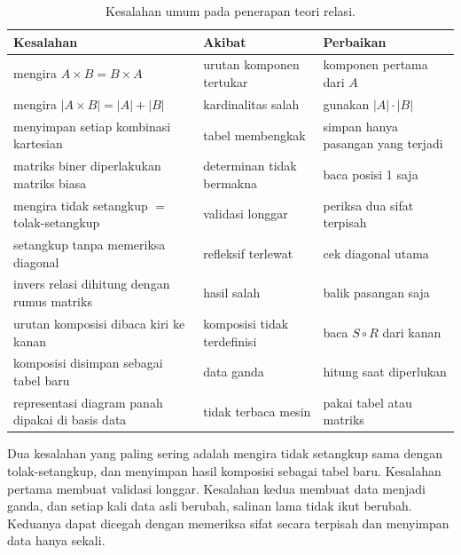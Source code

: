 \documentclass[11pt,a4paper]{article}
\begin{document}
\begin{table}[H]
	\centering
	\caption{Kesalahan umum pada penerapan teori relasi.}
	\label{tab:kesalahan}
	\footnotesize
	\begin{tabularx}{\textwidth}{l X X}
		\toprule
		Kesalahan                                        & Akibat                      & Perbaikan                          \\
		\midrule
		mengira $A \times B=B \times A$                  & urutan komponen tertukar    & komponen pertama dari $A$          \\
		mengira $|A \times B|=|A|+|B|$                   & kardinalitas salah          & gunakan $|A| \cdot |B|$            \\
		menyimpan setiap kombinasi kartesian             & tabel membengkak            & simpan hanya pasangan yang terjadi \\
		matriks biner diperlakukan matriks biasa         & determinan tidak bermakna   & baca posisi 1 saja                 \\
		mengira tidak setangkup $=$ tolak-setangkup      & validasi longgar            & periksa dua sifat terpisah         \\
		setangkup tanpa memeriksa diagonal               & refleksif terlewat          & cek diagonal utama                 \\
		invers relasi dihitung dengan rumus matriks      & hasil salah                 & balik pasangan saja                \\
		urutan komposisi dibaca kiri ke kanan            & komposisi tidak terdefinisi & baca $S \circ R$ dari kanan        \\
		komposisi disimpan sebagai tabel baru            & data ganda                  & hitung saat diperlukan             \\
		representasi diagram panah dipakai di basis data & tidak terbaca mesin         & pakai tabel atau matriks           \\
		\bottomrule
	\end{tabularx}
\end{table}

Dua kesalahan yang paling sering adalah mengira tidak setangkup sama dengan tolak-setangkup, dan menyimpan hasil komposisi sebagai tabel baru. Kesalahan pertama membuat validasi longgar. Kesalahan kedua membuat data menjadi ganda, dan setiap kali data asli berubah, salinan lama tidak ikut berubah. Keduanya dapat dicegah dengan memeriksa sifat secara terpisah dan menyimpan data hanya sekali.
\end{document}
